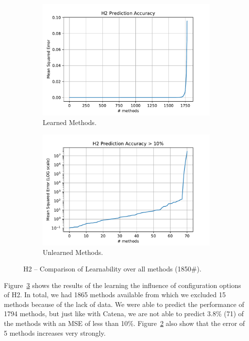 \begin{figure}[h]
	\centering
	\begin{subfigure}{.5\textwidth}
	  \centering
	  \includegraphics[width=.99\linewidth]{images/H2_plt_learnable_func_all_model_mse}
	  \caption{Learned Methods.}
	  \label{fig:h2_model_mse_lern}
	\end{subfigure}%
	\begin{subfigure}{.5\textwidth}
	  \centering
	  \includegraphics[width=.99\linewidth]{images/H2_plt_unlearnable_func_all_model_mse_log}
	  \caption{Unlearned Methods.}
	  \label{fig:h2_model_mse_unlern}
	\end{subfigure}
	\caption{H2 -- Comparison of Learnability over all methods (1850\#).}
	\label{fig:h_lernability_all_methods}
\end{figure}

Figure~\ref{fig:h_lernability_all_methods} shows the results of the learning the influence of configuration options of H2. In total, we had 1865 methods available from which we excluded 15 methods because of the lack of data. We were able to predict the performance of 1794 methods, but just like with Catena, we are not able to predict 3.8\% (71) of the methods with an \ac{MSE} of less than 10\%. Figure~\ref{fig:h2_model_mse_unlern} also show that the error of 5 methods increases very strongly. 

